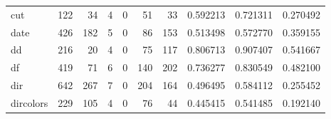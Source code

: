 \begin{tabular}{lrrrrrrrrr}
cut       &                                                122 &                                                 34 &                                                  4 &                                                  0 &                                                 51 &                                                 33 &                                           0.592213 &                               0.721311 &                             0.270492 \\
date      &                                                426 &                                                182 &                                                  5 &                                                  0 &                                                 86 &                                                153 &                                           0.513498 &                               0.572770 &                             0.359155 \\
dd        &                                                216 &                                                 20 &                                                  4 &                                                  0 &                                                 75 &                                                117 &                                           0.806713 &                               0.907407 &                             0.541667 \\
df        &                                                419 &                                                 71 &                                                  6 &                                                  0 &                                                140 &                                                202 &                                           0.736277 &                               0.830549 &                             0.482100 \\
dir       &                                                642 &                                                267 &                                                  7 &                                                  0 &                                                204 &                                                164 &                                           0.496495 &                               0.584112 &                             0.255452 \\
dircolors &                                                229 &                                                105 &                                                  4 &                                                  0 &                                                 76 &                                                 44 &                                           0.445415 &                               0.541485 &                             0.192140 \\

\end{tabular}
